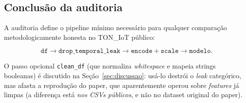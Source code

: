 \subsection{Conclusão da auditoria}

A auditoria define o pipeline mínimo necessário para qualquer
comparação metodologicamente honesta no TON\_IoT público:

\[
  \texttt{df} \rightarrow \texttt{drop\_temporal\_leak} \rightarrow
  \texttt{encode} + \texttt{scale} \rightarrow \texttt{modelo}.
\]

O passo opcional \texttt{clean\_df} (que normaliza
\emph{whitespace} e mapeia strings booleanas) é discutido na
Seção~\ref{sec:discussao}: usá-lo destrói o \emph{leak} categórico,
mas afasta a reprodução do paper, que aparentemente operou sobre
\emph{features} já limpas (a diferença está \emph{nos CSVs públicos}, e
não no dataset original do paper).
